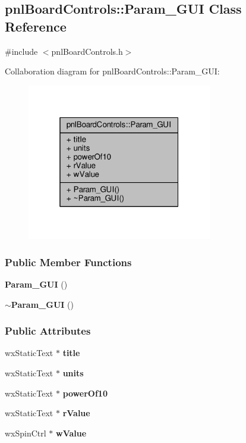 \subsection{pnl\+Board\+Controls\+:\+:Param\+\_\+\+G\+UI Class Reference}
\label{classpnlBoardControls_1_1Param__GUI}


{\ttfamily \#include $<$pnl\+Board\+Controls.\+h$>$}



Collaboration diagram for pnl\+Board\+Controls\+:\+:Param\+\_\+\+G\+UI\+:
\nopagebreak
\begin{figure}[H]
\begin{center}
\leavevmode
\includegraphics[width=229pt]{dd/d03/classpnlBoardControls_1_1Param__GUI__coll__graph}
\end{center}
\end{figure}
\subsubsection*{Public Member Functions}
\begin{DoxyCompactItemize}
\item 
{\bf Param\+\_\+\+G\+UI} ()
\item 
{\bf $\sim$\+Param\+\_\+\+G\+UI} ()
\end{DoxyCompactItemize}
\subsubsection*{Public Attributes}
\begin{DoxyCompactItemize}
\item 
wx\+Static\+Text $\ast$ {\bf title}
\item 
wx\+Static\+Text $\ast$ {\bf units}
\item 
wx\+Static\+Text $\ast$ {\bf power\+Of10}
\item 
wx\+Static\+Text $\ast$ {\bf r\+Value}
\item 
wx\+Spin\+Ctrl $\ast$ {\bf w\+Value}
\end{DoxyCompactItemize}


